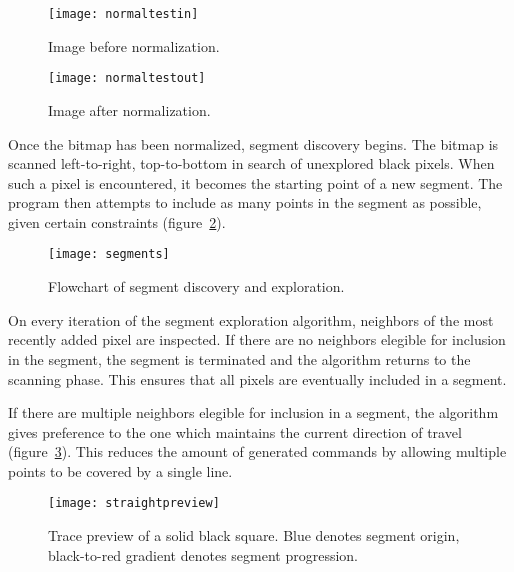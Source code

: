 \clearpage
\begin{figure}[ht]
    \centering
    \begin{minipage}{0.5\textwidth}
        \centering
        \texttt{[image: normaltestin]}
        \caption{Image before normalization.}
    \end{minipage}\hfill
    \begin{minipage}{0.5\textwidth}
        \centering
        \texttt{[image: normaltestout]}
        \caption{Image after normalization.}
        \label{normalize}
    \end{minipage}
\end{figure}

Once the bitmap has been normalized, segment discovery begins. The bitmap is
scanned left-to-right, top-to-bottom in search of unexplored black pixels.
When such a pixel is encountered, it becomes the starting point of a new
segment. The program then attempts to include as many points in the segment as
possible, given certain constraints (figure~\ref{segments}).

\begin{figure}[ht]
    \begin{center}
        \texttt{[image: segments]}
        \caption{Flowchart of segment discovery and exploration.}
        \label{segments}
    \end{center}
\end{figure}

On every iteration of the segment exploration algorithm, neighbors of the most
recently added pixel are inspected. If there are no neighbors elegible for
inclusion in the segment, the segment is terminated and the algorithm returns
to the scanning phase. This ensures that all pixels are eventually included in
a segment.

If there are multiple neighbors elegible for inclusion in a segment, the
algorithm gives preference to the one which maintains the current direction of
travel (figure~\ref{straight}). This reduces the amount of generated commands
by allowing multiple points to be covered by a single line.

\begin{figure}[ht]
    \begin{center}
        \texttt{[image: straightpreview]}
        \caption{Trace preview of a solid black square. Blue denotes segment
        origin, black-to-red gradient denotes segment progression.}
        \label{straight}
    \end{center}
\end{figure}


